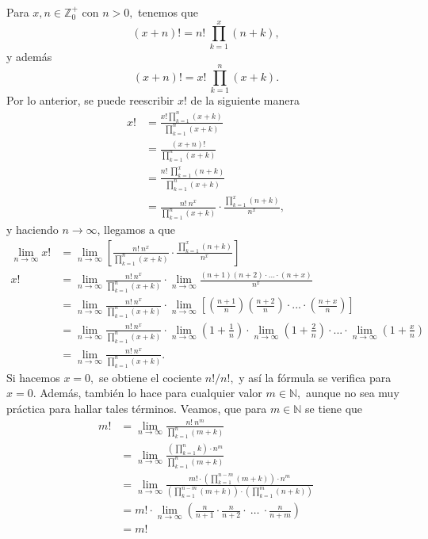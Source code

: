 Para $x, n \in \mathbb{Z}_0^+$ con $n>0,$ tenemos que $$(x+n)! = n!\ \prod_{k=1}^{x}(n+k),$$ y además $$(x+n)! = x!\ \prod_{k=1}^{n}(x+k).$$ Por lo anterior, se puede reescribir $x!$ de la siguiente manera
\begin{align*}
	x! &= \frac{x!\prod_{k = 1}^{n}(x+k)}{\prod_{k = 1}^{n}(x+k)} \\
	&= \frac{(x+n)!}{\prod_{k=1}^{n}(x+k)} \\
	&= \frac{n!\ \prod_{k=1}^{x}(n+k)}{\prod_{k=1}^{n}(x+k)} \\
	&= \frac{n!\ n^x}{\prod_{k=1}^{n}(x+k)}\cdot\frac{\prod_{k=1}^{x}(n+k)}{n^x},
\end{align*}
y haciendo $n\rightarrow\infty$, llegamos a que
\begin{align*}
	\lim_{n\rightarrow\infty} x! &= \lim_{n\rightarrow\infty} \left[\frac{n!\  n^x}{\prod_{k=1}^{n}(x+k)}\cdot\frac{\prod_{k=1}^{x}(n+k)}{n^x}\right] \\
	x! &= \lim_{n\rightarrow\infty} \frac{n!\ n^x}{\prod_{k=1}^{n}(x+k)} \cdot \lim_{n\rightarrow\infty} \frac{(n+1)(n+2)\cdot...\cdot(n+x)}{n^x}  \\
	&= \lim_{n\rightarrow\infty} \frac{n!\ n^x}{\prod_{k=1}^{n}(x+k)} \cdot \lim_{n\rightarrow\infty} \left[\left(\frac{n+1}{n}\right)\left(\frac{n+2}{n}\right)\cdot...\cdot\left(\frac{n+x}{n}\right)\right]  \\
	&= \lim_{n\rightarrow\infty} \frac{n!\ n^x}{\prod_{k=1}^{n}(x+k)} \cdot \lim_{n\rightarrow\infty} \left(1+\tfrac{1}{n}\right)\cdot \lim_{n\rightarrow\infty} \left(1+\tfrac{2}{n}\right)\cdot ...\cdot \lim_{n\rightarrow\infty} \left(1+\tfrac{x}{n}\right) \\
	&= \lim_{n\rightarrow\infty} \frac{n!\ n^x}{\prod_{k=1}^{n}(x+k)}.
\end{align*}
Si hacemos $x = 0,$ se obtiene el cociente $n!/n!,$ y así la fórmula se verifica para $x = 0.$ Además, también lo hace para cualquier valor $m \in \mathbb{N},$ aunque no sea muy práctica para hallar tales términos. Veamos, que para $m \in \mathbb{N}$ se tiene que
\begin{align*}
	m! &= \lim_{n \rightarrow \infty} \frac{n!\ n^m}{\prod_{k=1}^{n}(m+k)}\\
		&= \lim_{n \rightarrow \infty} \frac{(\prod_{k=1}^{n}k)\cdot n^m}{\prod_{k=1}^{n}(m+k)}\\
		&= 	\lim_{n \rightarrow \infty} \frac{m!\cdot(\prod_{k=1}^{n-m}(m+k))\cdot n^m}{(\prod_{k=1}^{n-m}(m+k))\cdot(\prod_{k=1}^{m}(n+k))}\\
		&= m!\cdot \lim_{n \rightarrow \infty} \left(\frac{n}{n+1}\cdot\frac{n}{n+2}\cdot\ \dots\ \cdot\frac{n}{n+m}\right)\\
		&= m!
\end{align*}
